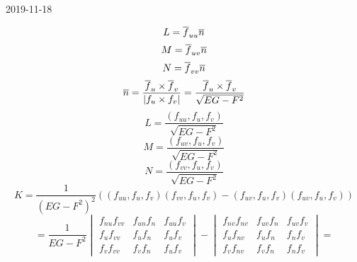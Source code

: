 \documentclass[main]{subfiles}
\begin{document}
\begin{lect}{2019-11-18}
      \begin{Proof}[теоремы]
          \[L = \overline{f}_{uu} \overline{n}\]
          \[M = \overline{f}_{uv} \overline{n}\]
          \[N = \overline{f}_{vv} \overline{n}\]
          \[\overline{n} = \frac{\overline{f}_u \times \overline{f}_v}{|f_u \times f_v|} = \frac{\overline{f}_u \times \overline{f}_v}{\sqrt{EG - F^2}}\]
          \[L = \frac{(f_{uu}, f_u, f_v)}{\sqrt{EG - F^2}}\]
          \[M = \frac{(f_{uv}, f_u, f_v)}{\sqrt{EG - F^2}}\]
          \[N = \frac{(f_{vv}, f_u, f_v)}{\sqrt{EG - F^2}}\]
          \[K = \frac{1}{(EG - F^2)^2} ( (f_{uu}, f_u, f_v)(f_{vv}, f_u, f_v) - (f_{uv}, f_u, f_v)(f_{uv}, f_u, f_v) )\]
          \[= \frac{1}{EG - F^2} \begin{vmatrix}
            f_{nu}f_{vv} & f_{un}f_{n} & f_{uu}f_{v}\\
            f_{u}f_{vv} & f_{u}f_{n} & f_{u}f_{v}\\
            f_{v}f_{vv} & f_{v}f_{n} & f_{u}f_{v}
          \end{vmatrix} - \begin{vmatrix}
            f_{nv}f_{nv} & f_{uv}f_{n} & f_{uv}f_{v}\\
            f_{u}f_{nv} & f_{u}f_{n} & f_{n}f_{v}\\
            f_{v}f_{nv} & f_{v}f_{n} & f_{n}f_{v}
          \end{vmatrix} =\]


\end{Proof}
\end{lect}
\end{document}

